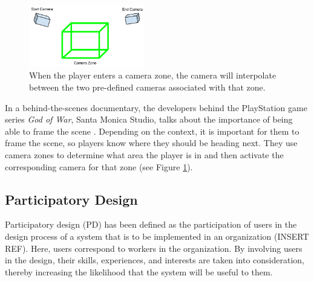 

\begin{figure}[htbp]
\centering
\includegraphics[width=0.45\textwidth]{Pics/gow_cameraZones2}
\caption{When the player enters a camera zone, the camera will interpolate between the two pre-defined cameras associated with that zone.}
\label{fig:gow_zones}
\end{figure}

In a behind-the-scenes documentary, the developers behind the PlayStation game series \textit{God of War}, Santa Monica Studio, talks about the importance of being able to frame the scene \cite{gow_camera}. Depending on the context, it is important for them to frame the scene, so players know where they should be heading next. They use camera zones to determine what area the player is in and then activate the corresponding camera for that zone (see Figure \ref{fig:gow_zones}).




\subsection{Participatory Design}
Participatory design (PD) has been defined as the participation of users in the design process of a system that is to be implemented in an organization (INSERT REF). Here, users correspond to workers in the organization. By involving users in the design, their skills, experiences, and interests are taken into consideration, thereby increasing the likelihood that the system will be useful to them.


